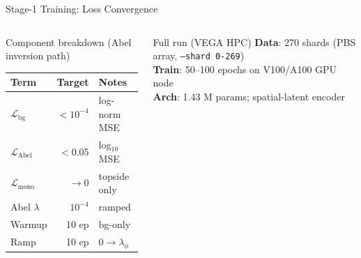 \documentclass[aspectratio=169,10pt]{beamer}
\begin{document}
\begin{frame}{Stage-1 Training: Loss Convergence}
\begin{columns}
\begin{block}{\scriptsize Component breakdown (Abel inversion path)}
  \scriptsize
  \begin{tabular}{lrl}
  \toprule
  Term & Target & Notes \\
  \midrule
  $\mathcal{L}_\mathrm{bg}$   & $<10^{-4}$ & log-norm MSE \\
  $\mathcal{L}_\mathrm{Abel}$ & $<0.05$    & log$_{10}$ MSE \\
  $\mathcal{L}_\mathrm{mono}$ & $\to 0$    & topside only \\
  \midrule
  Abel $\lambda$ & $10^{-4}$ & ramped \\
  Warmup & 10 ep & bg-only \\
  Ramp & 10 ep & $0\to\lambda_\phi$ \\
  \bottomrule
  \end{tabular}
\end{block}
\vspace{3pt}
\begin{alertblock}{\scriptsize Full run (VEGA HPC)}
  \scriptsize
  \textbf{Data}: 270 shards (PBS array, \texttt{--shard 0-269})\\
  \textbf{Train}: 50--100 epochs on V100/A100 GPU node\\
  \textbf{Arch}: 1.43 M params; spatial-latent encoder
\end{alertblock}
\end{columns}
\end{frame}
\end{document}
